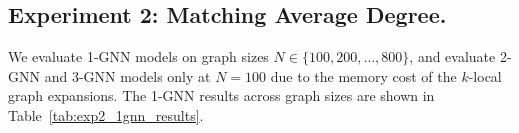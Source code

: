 




\subsection{Experiment 2: Matching Average Degree.}

We evaluate 1-GNN models on graph sizes $N \in \{100,200,\ldots,800\}$, and evaluate 2-GNN and 3-GNN models only at $N = 100$ due to the memory cost of the $k$-local graph expansions. The 1-GNN results across graph sizes are shown in Table~\ref{tab:exp2_1gnn_results}.

